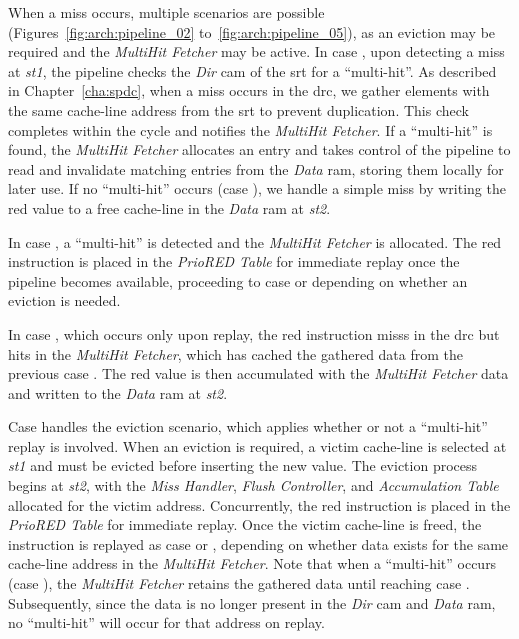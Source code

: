 When a \gls{miss} occurs, multiple scenarios are possible (Figures~\ref{fig:arch:pipeline_02} to~\ref{fig:arch:pipeline_05}), as an \gls{eviction} may be required and the \textit{MultiHit Fetcher} may be active.
In case , upon detecting a \gls{miss} at \textit{st1}, the \gls{pipeline} checks the \textit{Dir} \acrshort{cam} of the \acrshort{srt} for a ``multi-\gls{hit}''.
As described in Chapter~\ref{cha:spdc}, when a \gls{miss} occurs in the \acrshort{drc}, we gather elements with the same cache-line address from the \acrshort{srt} to prevent duplication.
This check completes within the cycle and notifies the \textit{MultiHit Fetcher}.
If a ``multi-\gls{hit}'' is found, the \textit{MultiHit Fetcher} allocates an entry and takes control of the \gls{pipeline} to read and invalidate matching entries from the \textit{Data} \acrshort{ram}, storing them locally for later use.
If no ``multi-\gls{hit}'' occurs (case ), we handle a simple \gls{miss} by writing the \acrshort{red} value to a free cache-line in the \textit{Data} \acrshort{ram} at \textit{st2}.

In case , a ``multi-\gls{hit}'' is detected and the \textit{MultiHit Fetcher} is allocated.
The \acrshort{red} instruction is placed in the \textit{PrioRED Table} for immediate replay once the \gls{pipeline} becomes available, proceeding to case  or  depending on whether an \gls{eviction} is needed.

In case , which occurs only upon replay, the \acrshort{red} instruction \glspl{miss} in the \acrshort{drc} but \glspl{hit} in the \textit{MultiHit Fetcher}, which has cached the gathered data from the previous case .
The \acrshort{red} value is then accumulated with the \textit{MultiHit Fetcher} data and written to the \textit{Data} \acrshort{ram} at \textit{st2}.

Case  handles the \gls{eviction} scenario, which applies whether or not a ``multi-\gls{hit}'' replay is involved.
When an \gls{eviction} is required, a victim cache-line is selected at \textit{st1} and must be evicted before inserting the new value.
The \gls{eviction} process begins at \textit{st2}, with the \textit{Miss Handler}, \textit{Flush Controller}, and \textit{Accumulation Table} allocated for the victim address.
Concurrently, the \acrshort{red} instruction is placed in the \textit{PrioRED Table} for immediate replay.
Once the victim cache-line is freed, the instruction is replayed as case  or , depending on whether data exists for the same cache-line address in the \textit{MultiHit Fetcher}.
Note that when a ``multi-\gls{hit}'' occurs (case ), the \textit{MultiHit Fetcher} retains the gathered data until reaching case .
Subsequently, since the data is no longer present in the \textit{Dir} \acrshort{cam} and \textit{Data} \acrshort{ram}, no ``multi-\gls{hit}'' will occur for that address on replay.

